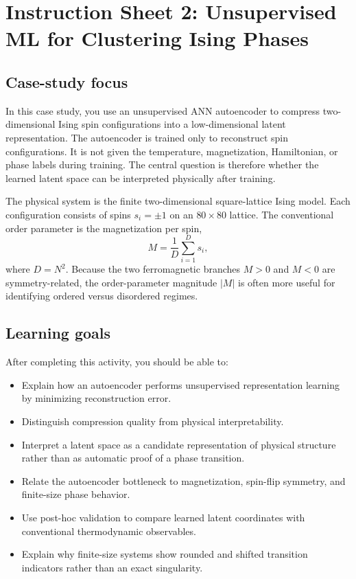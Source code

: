 \documentclass[11pt]{article}
\begin{document}
\section*{Instruction Sheet 2: Unsupervised ML for Clustering Ising Phases}

\subsection*{Case-study focus}
In this case study, you use an unsupervised ANN autoencoder to compress two-dimensional Ising spin configurations into a low-dimensional latent representation. The autoencoder is trained only to reconstruct spin configurations. It is not given the temperature, magnetization, Hamiltonian, or phase labels during training. The central question is therefore whether the learned latent space can be interpreted physically after training.

The physical system is the finite two-dimensional square-lattice Ising model. Each configuration consists of spins \(s_i=\pm 1\) on an \(80\times 80\) lattice. The conventional order parameter is the magnetization per spin,
\[
M=\frac{1}{D}\sum_{i=1}^{D}s_i,
\]
where \(D=N^2\). Because the two ferromagnetic branches \(M>0\) and \(M<0\) are symmetry-related, the order-parameter magnitude \(|M|\) is often more useful for identifying ordered versus disordered regimes.

\subsection*{Learning goals}
After completing this activity, you should be able to:
\begin{itemize}
    \item Explain how an autoencoder performs unsupervised representation learning by minimizing reconstruction error.
    \item Distinguish compression quality from physical interpretability.
    \item Interpret a latent space as a candidate representation of physical structure rather than as automatic proof of a phase transition.
    \item Relate the autoencoder bottleneck to magnetization, spin-flip symmetry, and finite-size phase behavior.
    \item Use post-hoc validation to compare learned latent coordinates with conventional thermodynamic observables.
    \item Explain why finite-size systems show rounded and shifted transition indicators rather than an exact singularity.
\end{itemize}
\end{document}
